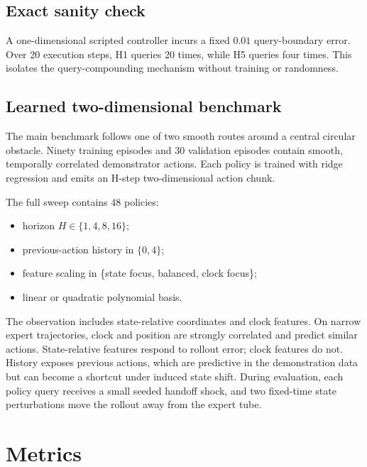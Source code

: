 \documentclass[11pt]{article}
\begin{document}
\subsection{Exact sanity check}

A one-dimensional scripted controller incurs a fixed $0.01$ query-boundary error. Over 20 execution steps, H1 queries 20 times, while H5 queries four times. This isolates the query-compounding mechanism without training or randomness.

\subsection{Learned two-dimensional benchmark}

The main benchmark follows one of two smooth routes around a central circular obstacle. Ninety training episodes and 30 validation episodes contain smooth, temporally correlated demonstrator actions. Each policy is trained with ridge regression and emits an H-step two-dimensional action chunk.

The full sweep contains 48 policies:
\begin{itemize}[leftmargin=1.5em]
  \item horizon $H\in\{1,4,8,16\}$;
  \item previous-action history in $\{0,4\}$;
  \item feature scaling in \{state focus, balanced, clock focus\};
  \item linear or quadratic polynomial basis.
\end{itemize}

The observation includes state-relative coordinates and clock features. On narrow expert trajectories, clock and position are strongly correlated and predict similar actions. State-relative features respond to rollout error; clock features do not. History exposes previous actions, which are predictive in the demonstration data but can become a shortcut under induced state shift. During evaluation, each policy query receives a small seeded handoff shock, and two fixed-time state perturbations move the rollout away from the expert tube.

\section{Metrics}
\end{document}
